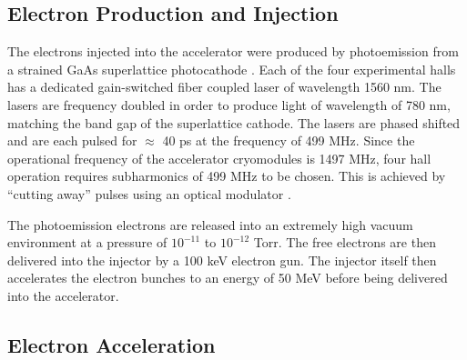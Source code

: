 \subsection{Electron Production and Injection}

The electrons injected into the accelerator were produced by photoemission from
a strained GaAs superlattice photocathode \cite{Maruyama:2004hx}.  Each of the 
four experimental halls has a dedicated gain-switched fiber coupled laser of
wavelength 1560 nm.  The lasers are frequency doubled in order to produce light
of wavelength of 780 nm, matching the band gap of the superlattice cathode. The
lasers are phased shifted and are each pulsed for $\approx$ 40 ps at the 
frequency of 499 MHz.  Since the operational frequency of the accelerator 
cryomodules is 1497 MHz, four hall operation requires subharmonics of 499 MHz to
be chosen.  This is achieved by ``cutting away'' pulses using an optical 
modulator \cite{Kazimi:2013yua}.


The photoemission electrons are released into an extremely high vacuum
environment at a pressure of $10^{-11}$ to $10^{-12}$ Torr.  The free electrons
are then delivered into the injector by a 100 keV electron gun.  The injector
itself then accelerates the electron bunches to an energy of 50 MeV 
before being delivered into the accelerator.

\subsection{Electron Acceleration}

